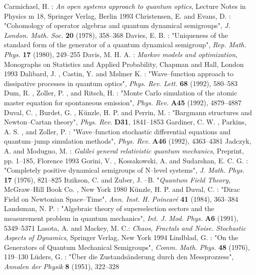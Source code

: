 \documentclass[12pt]{article}
\begin{document}
\begin{thebibliography}{99}
 Carmichael,  H. : 
{\sl An open systems approach to quantum optics}, 
Lecture Notes in Physics m 18,  Springer Verlag,  Berlin 1993
 Christensen,  E.  and Evans,  D. : "Cohomology of
operator algebras and quantum dynamical semigroups",  {\sl J.  London. 
Math.  Soc. }  {\bf 20} (1978), 358--368
 Davies,  E. B. : "Uniqueness of the standard form of
the generator of a quantum dynamical semigroup", {\sl
Rep. Math. Phys. }{\bf 17} (1980), 249--255
 Davis,  M. H. A. : {\sl Markov models and optimization}, 
Monographs on Statistics and Applied Probability,  Chapman and Hall,  London 1993 
 Dalibard,  J. ,  Castin,  Y.  and M{\o}lmer K. : 
"Wave--function approach to dissipative processes in quantum optics", 
{\sl Phys. Rev. Lett. }{\bf
68} (1992), 580--583
 Dum,  R. ,  Zoller,  P. ,  and Ritsch,  H. : 
"Monte Carlo simulation of the
atomic master equation for spontaneous emission", 
{\sl Phys. Rev. }{\bf A45} (1992), 4879--4887
 Duval,  C. ,  Burdet,  G. ,  K\"unzle,  H. P.  and Perrin, 
M. : "Bargmann structures and Newton--Cartan theory", {\sl Phys. Rev. }{\bf
D31}, 1841--1853 
 Gardiner,  C. W. ,  Parkins,  A. S. ,  and Zoller,  P. : 
"Wave--function stochastic differential equations and 
quantum--jump simulation methods", {\sl Phys. Rev. }{\bf A46} (1992), 4363--4381 
 Jadczyk,  A.  and Modugno,  M. : 
{\sl Galilei general relativistic quantum mechanics}, Preprint, pp. 1--185,  
Florence 1993
 Gorini,  V. ,  Kossakowski,  A.  and Sudarshan, 
E. C. G. : "Completely positive dynamical semigroups of N--level
systems",  {\sl J.  Math.  Phys. }{\bf 17} (1976), 821--825
 Itzikson,  C.  and Zuber,  J. --B. "{\sl Quantum Field
Theory},  McGraw--Hill Book Co. ,  New York 1980
K\"{u}nzle,  H. P.  and Duval,  C. :  "Dirac Field on Newtonian
Space--Time",  {\sl Ann.  Inst.  H.  Poincar\'{e} }{\bf 41}
 (1984), 363--384
 Landsman,  N. P. : "Algebraic theory of
superselection sectors and the measurement problem in quantum
mechanics", {\sl Int. J. Mod. Phys. }{\bf A6} (1991), 5349--5371 
 Lasota, A. and Mackey, M. C.: {\sl Chaos,
Fractals and Noise. Stochastic Aspects of Dynamics}, Springer Verlag,
New York 1994
 Lindblad,  G. : "On the Generators of Quantum Mechanical
Semigroups", {\sl Comm. Math. Phys. }{\bf 48} (1976), 119--130
 L\"uders,  G. : "\"Uber die Zustands\"anderung durch den
Messprozzess", {\sl Annalen der Physik }{\bf 8} (1951), 322--328

\end{thebibliography}
\end{document}
